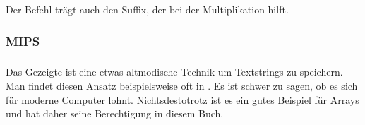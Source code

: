Der \ADD Befehl trägt auch den \LSL Suffix, der bei der Multiplikation hilft.

\subsubsection{MIPS}


\subsubsection{\Conclusion{}}
Das Gezeigte ist eine etwas altmodische Technik um Textstrings zu speichern.
Man findet diesen Ansatz beispielsweise oft in \oracle.
Es ist schwer zu sagen, ob es sich für moderne Computer lohnt.
Nichtsdestotrotz ist es ein gutes Beispiel für Arrays und hat daher seine Berechtigung in diesem Buch.


